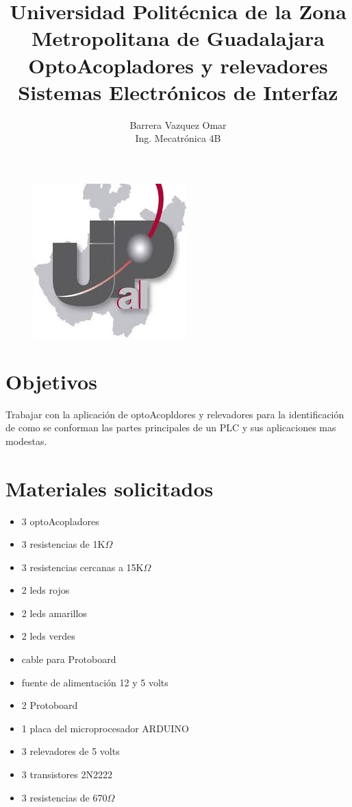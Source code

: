 \documentclass[11pt,a4paper]{article}
\title{\textbf{Universidad Politécnica de la Zona Metropolitana de Guadalajara
\\OptoAcopladores y relevadores
\\Sistemas Electrónicos de Interfaz}}
\begin{document}
\begin{center}
\begin{figure}
\begin{center}
\includegraphics[scale=1]{1.jpeg}
\end{center}
\end{figure}
\maketitle
\author{Barrera Vazquez Omar\\
Ing. Mecatrónica 4B}
\end{center}


\newpage

\section{Objetivos}
Trabajar con la aplicación de optoAcopldores y relevadores para la identificación de como se conforman las partes principales de un PLC y sus aplicaciones mas modestas.

\section{Materiales solicitados}
\begin{itemize}
\item 3 optoAcopladores
\item 3 resistencias de 1K$\Omega$
\item 3 resistencias cercanas a 15K$\Omega$
\item 2 leds rojos
\item 2 leds amarillos
\item 2 leds verdes
\item cable para Protoboard
\item fuente de alimentación 12 y 5 volts
\item 2 Protoboard
\item 1 placa del microprocesador ARDUINO
\item 3 relevadores de 5 volts
\item 3 transistores 2N2222
\item 3 resistencias de 670$\Omega$
\end{itemize}
\end{document}
